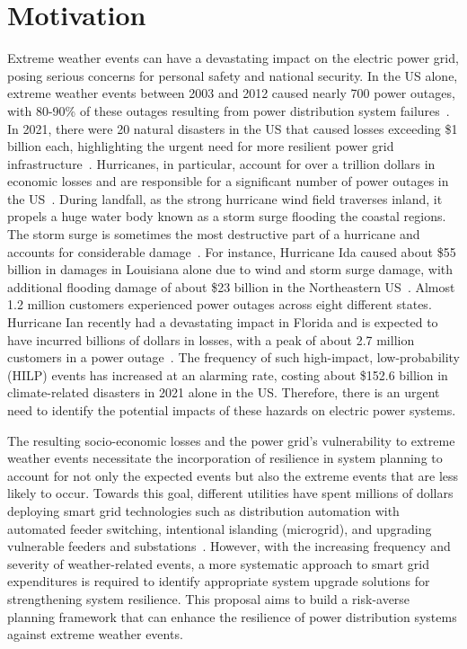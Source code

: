 \documentclass[hidelinks, 12pt]{article}
\begin{document}
\section{Motivation}
Extreme weather events can have a devastating impact on the electric power grid, posing serious concerns for personal safety and national security. In the US alone, extreme weather events between 2003 and 2012 caused nearly 700 power outages, with 80-90\% of these outages resulting from power distribution system failures~\cite{DOE_res}. In 2021, there were 20 natural disasters in the US that caused losses exceeding \$1 billion each, highlighting the urgent need for more resilient power grid infrastructure~\cite{noaa}. Hurricanes, in particular, account for over a trillion dollars in economic losses and are responsible for a significant number of power outages in the US~\cite{cost_NOAA, 2020}. During landfall, as the strong hurricane wind field traverses inland, it propels a huge water body known as a storm surge flooding the coastal regions. The storm surge is sometimes the most destructive part of a hurricane and accounts for considerable damage~\cite{surge_web}. For instance, Hurricane Ida caused about \$55 billion in damages in Louisiana alone due to wind and storm surge damage, with additional flooding damage of about \$23 billion in the Northeastern US~\cite{IDA_NOAA}. Almost 1.2 million customers experienced power outages across eight different states. Hurricane Ian recently had a devastating impact in Florida and is expected to have incurred billions of dollars in losses, with a peak of about 2.7 million customers in a power outage~\cite{DOE_IAN}. The frequency of such high-impact, low-probability (HILP) events has increased at an alarming rate, costing about \$152.6 billion in climate-related disasters in 2021 alone in the US. Therefore, there is an urgent need to identify the potential impacts of these hazards on electric power systems. 

The resulting socio-economic losses and the power grid's vulnerability to extreme weather events necessitate the incorporation of resilience in system planning to account for not only the expected events but also the extreme events that are less likely to occur. Towards this goal, different utilities have spent millions of dollars deploying smart grid technologies such as distribution automation with automated feeder switching, intentional islanding (microgrid), and upgrading vulnerable feeders and substations~\cite{9120304}. However, with the increasing frequency and severity of weather-related events, a more systematic approach to smart grid expenditures is required to identify appropriate system upgrade solutions for strengthening system resilience. This proposal aims to build a risk-averse planning framework that can enhance the resilience of power distribution systems against extreme weather events.
\end{document}
